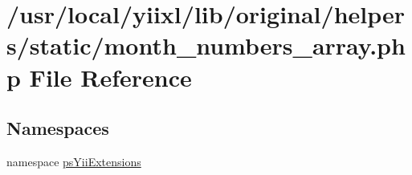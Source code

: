 \hypertarget{month__numbers__array_8php}{
\section{/usr/local/yiixl/lib/original/helpers/static/month\_\-numbers\_\-array.php File Reference}
\label{month__numbers__array_8php}
}
\subsection*{Namespaces}
\begin{DoxyCompactItemize}
\item 
namespace \hyperlink{namespacepsYiiExtensions}{psYiiExtensions}
\end{DoxyCompactItemize}
